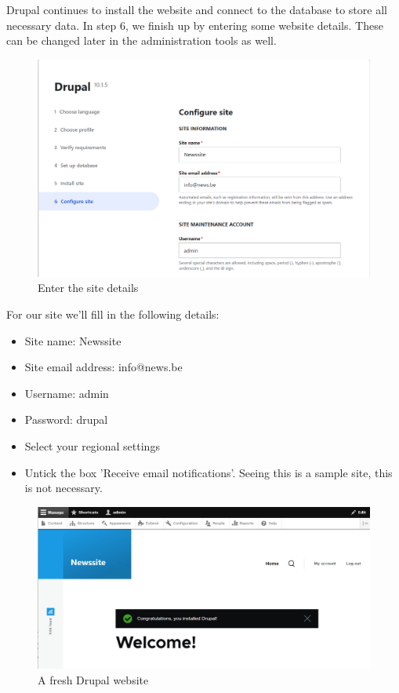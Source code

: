 Drupal continues to install the website and connect to the database to store all necessary data. In step 6, we finish up by entering some website details. These can be changed later in the administration tools as well.

\begin{figure}[h]
    \centering
    \includegraphics[width=1\linewidth]{img/ch3/install_step6}
    \caption{Enter the site details}
    \label{fig:install_step6}
\end{figure}

For our site we'll fill in the following details:
\begin{itemize}
    \item Site name: Newssite
    \item Site email address: info@news.be
    \item Username: admin
    \item Password: drupal
    \item Select your regional settings
    \item Untick the box 'Receive email notifications'. Seeing this is a sample site, this is not necessary.
\end{itemize}


\begin{figure}[h]
    \centering
    \includegraphics[width=1\linewidth]{img/ch3/install_complete}
    \caption{A fresh Drupal website}
    \label{fig:install_complete}
\end{figure}

